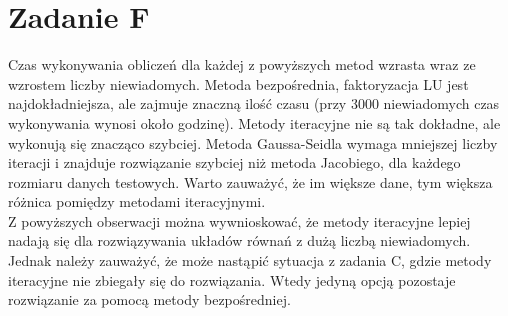 \documentclass{article} %
\begin{document}
\section{Zadanie F}
Czas wykonywania obliczeń dla każdej z powyższych metod wzrasta wraz ze wzrostem liczby niewiadomych. Metoda bezpośrednia, faktoryzacja LU jest najdokładniejsza, ale zajmuje znaczną ilość czasu (przy 3000 niewiadomych czas wykonywania wynosi około godzinę). Metody iteracyjne nie są tak dokładne, ale wykonują się znacząco szybciej. Metoda Gaussa-Seidla wymaga mniejszej liczby iteracji i znajduje rozwiązanie szybciej niż metoda Jacobiego, dla każdego rozmiaru danych testowych. Warto zauważyć, że im większe dane, tym większa różnica pomiędzy metodami iteracyjnymi. \\
Z powyższych obserwacji można wywnioskować, że metody iteracyjne lepiej nadają się dla rozwiązywania układów równań z dużą liczbą niewiadomych. Jednak należy zauważyć, że może nastąpić sytuacja z zadania C, gdzie metody iteracyjne nie zbiegały się do rozwiązania. Wtedy jedyną opcją pozostaje rozwiązanie za pomocą metody bezpośredniej.
\end{document}
